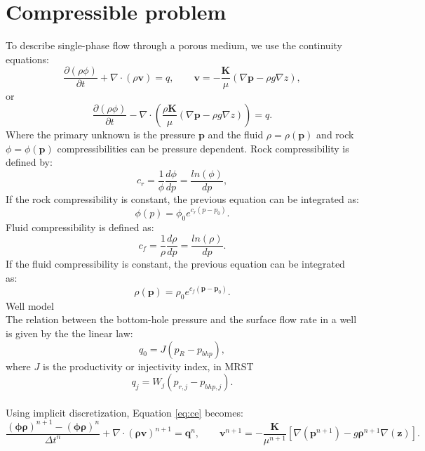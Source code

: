 \documentclass[12pt]{report}
\begin{document}
 \section*{Compressible problem}
To describe single-phase flow through a porous medium, we use the continuity equations:
\begin{equation}\label{eq:ce}
\frac{\partial (\rho \phi)}{\partial t}+ \nabla \cdot ( \rho \mathbf{v})=q, \qquad \mathbf{v}=-\frac{\mathbf{K}}{\mu}(\nabla \mathbf{p}-\rho g\nabla z),
\end{equation}
or
\begin{equation}\label{eq:ce1}
\frac{\partial (\rho \phi)}{\partial t}- \nabla \cdot \left( \frac{\rho\mathbf{K}}{\mu}(\nabla \mathbf{p}-\rho g\nabla z)\right)=q.
\end{equation}
Where the primary unknown is the pressure $\mathbf{p}$ and the fluid  $\rho=\rho(\mathbf{p})$ and rock $\phi=\phi(\mathbf{p})$ compressibilities can be pressure dependent.
Rock compressibility is defined by:
\begin{equation*}
 c_r=\frac{1}{\phi}\frac{d\phi}{dp}=\frac{ln(\phi)}{dp},
\end{equation*}
If the rock compressibility is constant, the previous equation can be integrated as:
\begin{equation*}
 \phi(p)=\phi_0 e^{c_r(p-p_0)}.
\end{equation*}
Fluid compressibility is defined as:
\begin{equation}\label{eq:fc}
 c_f=\frac{1}{\rho}\frac{d\rho}{dp}=\frac{ln(\rho)}{dp}.
\end{equation}
If the fluid compressibility is constant, the previous equation can be integrated as:
\begin{equation}\label{eq:rhoeq}
 \rho(\mathbf{p})=\rho_0 e^{c_f(\mathbf{p}-\mathbf{p}_0)}.
\end{equation}
Well model\\
The relation between the bottom-hole pressure and the surface flow rate in a well is given by the 
the linear law:
$$q_0=J(p_R-p_{bhp}),$$
where $J$ is the productivity or injectivity index, in MRST
$$q_{j}=W_j(p_{r,j}-p_{bhp,j}).$$\\
Using implicit discretization, Equation \eqref{eq:ce} becomes:
\begin{equation}\label{eq:ce2}
 \frac{(\mathbf{\phi}\mathbf{\rho})^{n+1}-(\mathbf{\phi}\mathbf{\rho})^{n}}{\Delta t^n}
 +\nabla \cdot (\mathbf{\rho} \mathbf{v})^{n+1}=\mathbf{q}^{n},
\qquad
\mathbf{v}^{n+1}= -\frac{\mathbf{K}}{\mu^{n+1}}[\nabla(\mathbf{p}^{n+1})-g\mathbf{\rho}^{n+1}\nabla(\mathbf{z})].
\end{equation}
\end{document}

